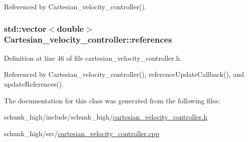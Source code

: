 Referenced by Cartesian\-\_\-velocity\-\_\-controller().

\hypertarget{classCartesian__velocity__controller_afc3792f1f6dd0025417d752a89e519e1}{
\subsubsection[{references}]{\setlength{\rightskip}{0pt plus 5cm}std\-::vector$<$double$>$ Cartesian\-\_\-velocity\-\_\-controller\-::references}}\label{classCartesian__velocity__controller_afc3792f1f6dd0025417d752a89e519e1}


Definition at line 46 of file cartesian\-\_\-velocity\-\_\-controller.\-h.



Referenced by Cartesian\-\_\-velocity\-\_\-controller(), reference\-Update\-Callback(), and update\-References().



The documentation for this class was generated from the following files\-:\begin{DoxyCompactItemize}
\item 
schunk\-\_\-high/include/schunk\-\_\-high/\hyperlink{cartesian__velocity__controller_8h}{cartesian\-\_\-velocity\-\_\-controller.\-h}\item 
schunk\-\_\-high/src/\hyperlink{cartesian__velocity__controller_8cpp}{cartesian\-\_\-velocity\-\_\-controller.\-cpp}\end{DoxyCompactItemize}
